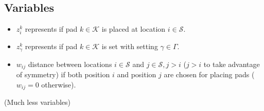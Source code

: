 \documentclass[10pt]{article}
\newcommand{\luiscomm}[1]{{\color{magenta} #1}}
\begin{document}
\subsection{Variables}
\begin{itemize}
		\item $z_{i}^{k} $ represents if pad $ k  \in \mathcal{K}$   is placed at location $ i \in \mathcal{S}$.
		\item $z_{\gamma}^{k} $ represents if pad $ k  \in \mathcal{K}$  is set with setting $ \gamma \in \Gamma$.
		\item $ w_{ij} $ distance between locations $ i \in \mathcal{S}$ and $ j\in \mathcal{S}, j > i$ ($j > i$ to take advantage of symmetry) if both position $i$ and position $j$ are chosen for placing pads ($w_{ij} = 0$ otherwise).
	\end{itemize}
	\luiscomm{(Much less variables)}
\end{document}
